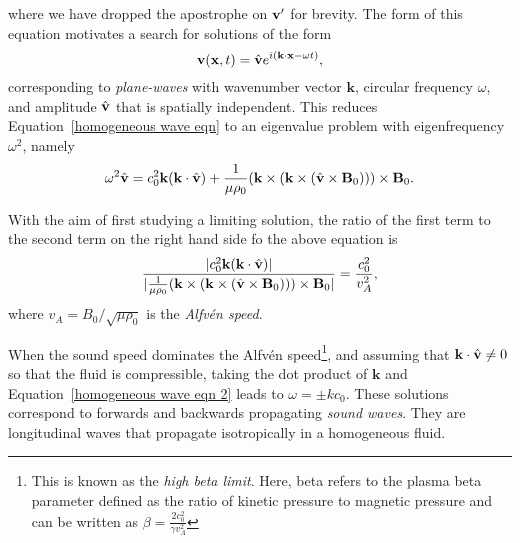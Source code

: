 \documentclass[12pt]{../style-files/ociamthesis}
\begin{document}
where we have dropped the apostrophe on $\mathbf{v}'$ for brevity. The form of this equation motivates a search for solutions of the form
\begin{equation}
	\mathbf{v}(\mathbf{x}, t) = \hat{\mathbf{v}}e^{i(\mathbf{k}\cdot\mathbf{x} - \omega t)},
\end{equation}
corresponding to \textit{plane-waves} with wavenumber vector $\mathbf{k}$, circular frequency $\omega$, and amplitude $\hat{\mathbf{v}}$ that is spatially independent. This reduces Equation~\eqref{homogeneous wave eqn} to an eigenvalue problem with eigenfrequency $\omega^2$, namely
\begin{equation}
	\omega^2\hat{\mathbf{v}} = c_0^2\mathbf{k}(\mathbf{k}\cdot\hat{\mathbf{v}}) + \frac{1}{\mu\rho_0}(\mathbf{k}\times(\mathbf{k}\times(\hat{\mathbf{v}}\times\mathbf{B}_0)))\times\mathbf{B}_0. \label{homogeneous wave eqn 2}
\end{equation}

With the aim of first studying a limiting solution, the ratio of the first term to the second term on the right hand side fo the above equation is
\begin{equation}
	\frac{|c_0^2\mathbf{k}(\mathbf{k}\cdot\hat{\mathbf{v}})|}{|\frac{1}{\mu\rho_0}(\mathbf{k}\times(\mathbf{k}\times(\hat{\mathbf{v}}\times\mathbf{B}_0)))\times\mathbf{B}_0|} = \frac{c_0^2}{v_A^2},
\end{equation}
where $v_A = B_0/\sqrt{\mu\rho_0}$ is the \textit{Alfv\'{e}n speed}.

When the sound speed dominates the Alfv\'{e}n speed\footnote{This is known as the \textit{high beta limit}. Here, beta refers to the plasma beta parameter defined as the ratio of kinetic pressure to magnetic pressure and can be written as $\beta = \frac{2c_0^2}{\gamma v_A^2}$}, and assuming that $\mathbf{k}\cdot\hat{\mathbf{v}} \neq 0$ so that the fluid is compressible, taking the dot product of $\mathbf{k}$ and Equation~\eqref{homogeneous wave eqn 2} leads to $\omega = \pm kc_0$. These solutions correspond to forwards and backwards propagating \textit{sound waves}. They are longitudinal waves that propagate isotropically in a homogeneous fluid.
\end{document}
